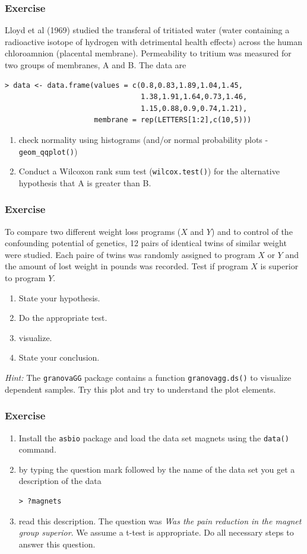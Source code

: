 \documentclass[xcolor={table}]{beamer}
\begin{document}
\begin{frame}[fragile]\frametitle{Exercise}
Lloyd et al (1969) studied the transferal of tritiated water (water containing a radioactive isotope of hydrogen with detrimental health effects) across the human chloroamnion (placental membrane). Permeability to tritium was measured for two groups of membranes, A and B. The data are\small
\begin{verbatim}
> data <- data.frame(values = c(0.8,0.83,1.89,1.04,1.45,
                                1.38,1.91,1.64,0.73,1.46,
                                1.15,0.88,0.9,0.74,1.21),
                     membrane = rep(LETTERS[1:2],c(10,5)))
\end{verbatim}\normalsize
\begin{enumerate}
  \item check normality using histograms (and/or normal probability plots - \texttt{geom\_qqplot()})
  \item Conduct a Wilcoxon rank sum test (\texttt{wilcox.test()}) for the alternative hypothesis that A is greater than B.
  \end{enumerate}
\end{frame}


\begin{frame}[fragile]\frametitle{Exercise}
To compare two different weight loss programs ($X$ and $Y$) and to control of the confounding potential of genetics, 12 pairs of identical twins of similar weight were studied. Each paire of twins was randomly assigned to program $X$ or $Y$ and the amount of lost weight in pounds was recorded. Test if program $X$ is superior to program $Y$.
  \begin{enumerate}
  \item State your hypothesis.
  \item Do the appropriate test.
  \item visualize.
  \item State your conclusion.
  \end{enumerate}
\textit{Hint:} The \texttt{granovaGG} package contains a function \texttt{granovagg.ds()} to visualize dependent samples. Try this plot and try to understand the plot elements.
\end{frame}


\begin{frame}[fragile]\frametitle{Exercise}
  \begin{enumerate}
  \item Install the \texttt{asbio} package and load the data set magnets using the \texttt{data()} command.
  \item by typing the question mark followed by the name of the data set you get a description of the data
\begin{verbatim}
> ?magnets  
\end{verbatim}
\item read this description. The question was \textit{Was the pain reduction in the magnet group superior}. We assume a t-test is appropriate. Do all necessary steps to answer this question.
  \end{enumerate}
\end{frame}
\end{document}
